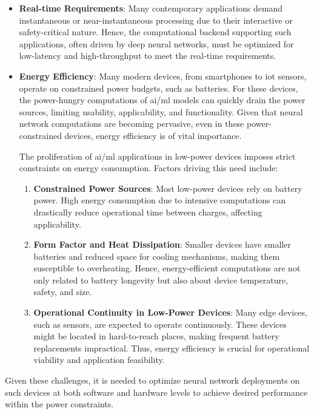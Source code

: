 \begin{itemize}
	\item \textbf{Real-time Requirements}:
	Many contemporary applications demand instantaneous or near-instantaneous processing due to their interactive or safety-critical nature. Hence, the computational backend supporting such applications, often driven by deep neural networks, must be optimized for low-latency and high-throughput to meet the real-time requirements.
	
	\item \textbf{Energy Efficiency}: Many modern devices, from smartphones to \gls{iot} sensors, operate on constrained power budgets, such as batteries. For these devices, the power-hungry computations of \gls{ai}/\gls{ml} models can quickly drain the power sources, limiting usability, applicability, and functionality. Given that neural network computations are becoming pervasive, even in these power-constrained devices, energy efficiency is of vital importance.
	
	The proliferation of \gls{ai}/\gls{ml} applications in low-power devices imposes strict constraints on energy consumption. Factors driving this need include:
	
	\begin{enumerate}
		\item \textbf{Constrained Power Sources}: Most low-power devices rely on battery power. High energy consumption due to intensive computations can drastically reduce operational time between charges, affecting applicability.
		
		\item \textbf{Form Factor and Heat Dissipation}: Smaller devices have smaller batteries and reduced space for cooling mechanisms, making them susceptible to overheating. Hence, energy-efficient computations are not only related to battery longevity but also about device temperature, safety, and size.
		
		\item \textbf{Operational Continuity in Low-Power Devices}: Many edge devices, such as sensors, are expected to operate continuously. These devices might be located in hard-to-reach places, making frequent battery replacements impractical. Thus, energy efficiency is crucial for operational viability and application feasibility.
	\end{enumerate}
	
\end{itemize}

Given these challenges, it is needed to optimize neural network deployments on such devices at both software and hardware levels to achieve desired performance within the power constraints.

